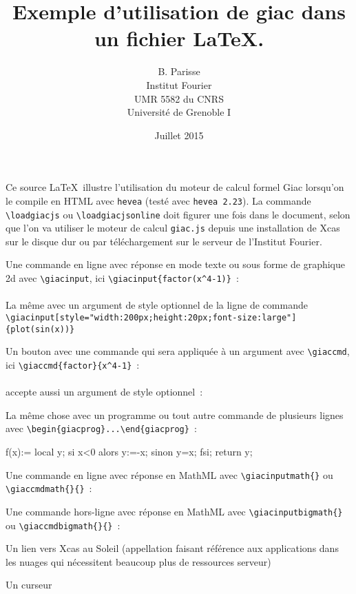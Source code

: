 \documentclass[a4paper,11pt]{article}
\title {Exemple d'utilisation de giac dans un fichier \LaTeX.}
\author{B. Parisse\\Institut Fourier\\UMR 5582 du CNRS
\\Université de Grenoble I}
\date{Juillet 2015}
\begin{document}
\maketitle

Ce source \LaTeX\ illustre l'utilisation du moteur de calcul formel Giac
lorsqu'on le compile en HTML avec {\tt hevea} (test\'e avec \verb|hevea 2.23|).
La commande \verb|\loadgiacjs| ou \verb|\loadgiacjsonline|
doit figurer une fois dans le document, selon que l'on va utiliser le moteur
de calcul \verb|giac.js| depuis une installation de Xcas sur le disque dur
ou par t\'el\'echargement sur le serveur de l'Institut Fourier.
\loadgiacjsonline

Une commande en ligne avec r\'eponse en mode texte ou sous forme de graphique 2d 
avec \verb|\giacinput|, ici \verb|\giacinput{factor(x^4-1)}|~:\\
\\
La m\^eme avec un argument de style optionnel de la ligne de commande\\ 
\verb|\giacinput[style="width:200px;height:20px;font-size:large"]{plot(sin(x))}|\\

Un bouton avec une commande qui sera appliqu\'ee \`a un argument avec
\verb|\giaccmd|, ici \verb|\giaccmd{factor}{x^4-1}|~:\\
\\
accepte aussi un argument de style optionnel~:

La m\^eme chose avec un programme ou tout autre commande de plusieurs lignes
avec \verb|\begin{giacprog}...\end{giacprog}|~:
\begin{giacprog}
f(x):={
  local y;
  si x<0 alors y:=-x; sinon y=x; fsi;
  return y;
}
\end{giacprog}

Une commande en ligne avec r\'eponse en MathML avec
\verb|\giacinputmath{}| ou \verb|\giaccmdmath{}{}|~:

Une commande hors-ligne avec r\'eponse en MathML
avec \verb|\giacinputbigmath{}| ou \verb|\giaccmdbigmath{}{}|~:

Un lien vers Xcas au Soleil (appellation faisant r\'ef\'erence aux
applications dans les nuages qui n\'ecessitent beaucoup plus de
ressources serveur)

Un curseur
\end{document}
